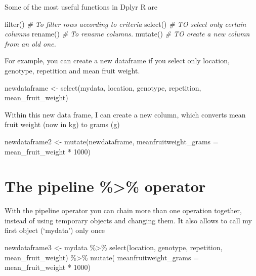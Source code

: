 \documentclass[
]{book}
\newenvironment{Shaded}{\begin{snugshade}}{\end{snugshade}}
\newcommand{\AttributeTok}[1]{\textcolor[rgb]{0.77,0.63,0.00}{#1}}
\newcommand{\CommentTok}[1]{\textcolor[rgb]{0.56,0.35,0.01}{\textit{#1}}}
\newcommand{\DecValTok}[1]{\textcolor[rgb]{0.00,0.00,0.81}{#1}}
\newcommand{\FunctionTok}[1]{\textcolor[rgb]{0.00,0.00,0.00}{#1}}
\newcommand{\NormalTok}[1]{#1}
\newcommand{\OtherTok}[1]{\textcolor[rgb]{0.56,0.35,0.01}{#1}}
\newcommand{\SpecialCharTok}[1]{\textcolor[rgb]{0.00,0.00,0.00}{#1}}
\begin{document}
Some of the most useful functions in Dplyr R are

\begin{Shaded}
\begin{Highlighting}[]
\FunctionTok{filter}\NormalTok{() }\CommentTok{\# To filter rows according to criteria}
\FunctionTok{select}\NormalTok{() }\CommentTok{\# TO select only certain columns}
\FunctionTok{rename}\NormalTok{() }\CommentTok{\# To rename columns. }
\FunctionTok{mutate}\NormalTok{() }\CommentTok{\# TO create a new column from an old one.}
\end{Highlighting}
\end{Shaded}

For example, you can create a new dataframe if you select only location, genotype, repetition and mean fruit weight.

\begin{Shaded}
\begin{Highlighting}[]
\NormalTok{newdataframe }\OtherTok{\textless{}{-}} \FunctionTok{select}\NormalTok{(mydata, location, genotype, repetition, mean\_fruit\_weight)}
\end{Highlighting}
\end{Shaded}

Within this new data frame, I can create a new column, which converts mean fruit weight (now in kg) to grams (g)

\begin{Shaded}
\begin{Highlighting}[]
\NormalTok{newdataframe2 }\OtherTok{\textless{}{-}} \FunctionTok{mutate}\NormalTok{(newdataframe, }\AttributeTok{meanfruitweight\_grams =}\NormalTok{ mean\_fruit\_weight }\SpecialCharTok{*} \DecValTok{1000}\NormalTok{)}
\end{Highlighting}
\end{Shaded}

\hypertarget{the-pipeline-operator}{%
\section{The pipeline \%\textgreater\% operator}\label{the-pipeline-operator}}

With the pipeline operator you can chain more than one operation together, instead of using temporary objects and changing them. It also allows to call my first object (`mydata') only once

\begin{Shaded}
\begin{Highlighting}[]
\NormalTok{newdataframe3 }\OtherTok{\textless{}{-}}\NormalTok{ mydata }\SpecialCharTok{\%\textgreater{}\%}
                 \FunctionTok{select}\NormalTok{(location, genotype, repetition, mean\_fruit\_weight) }\SpecialCharTok{\%\textgreater{}\%}
                 \FunctionTok{mutate}\NormalTok{( }\AttributeTok{meanfruitweight\_grams =}\NormalTok{ mean\_fruit\_weight }\SpecialCharTok{*} \DecValTok{1000}\NormalTok{)}
\end{Highlighting}
\end{Shaded}
\end{document}

